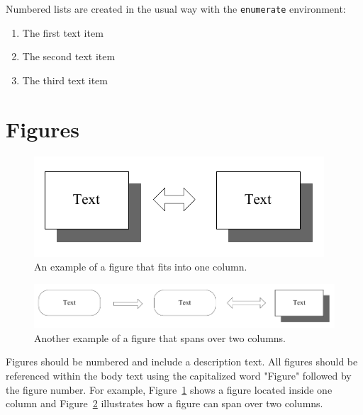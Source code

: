 \documentclass[11pt,a4paper,twocolumn]{article}
\begin{document}
Numbered lists are created in the usual way with the \texttt{enumerate} environment:
\begin{enumerate}
  \item The first text item
  \item The second text item
  \item The third text item
\end{enumerate}

\section{Figures}

\begin{figure}[b]
\centering
\includegraphics[width=0.4 \textwidth]{figure1}
\caption{An example of a figure that fits into one column.}
\label{fig:figure1}
\end{figure}

\begin{figure}[htb]
\centering
\includegraphics[width=0.9 \textwidth]{figure2}
\caption{Another example of a figure that spans over two columns.}
\label{fig:figure2}
\end{figure}

Figures should be numbered and include a description text. All figures
should be referenced within the body text using the capitalized word
"Figure" followed by the figure number. For example,
Figure~\ref{fig:figure1} shows a figure located inside one column and
Figure~\ref{fig:figure2} illustrates how a figure can span over two
columns. 
\end{document}

